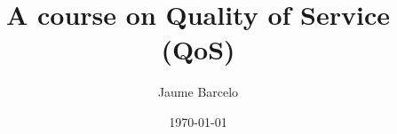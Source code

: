 \documentclass[12pt]{book}
\begin{document}
\frontmatter
\pagestyle{empty}
\title{\textbf{A course on Quality of Service (QoS)}}
\author{Jaume Barcelo}
\date{\today}
\maketitle
%
\pagestyle{fancy}
%
\tableofcontents
%
\mainmatter
%









\begin{appendices}
\appendixpage
\noappendicestocpagenum
\addappheadtotoc


\end{appendices}
\backmatter
%


\end{document}
